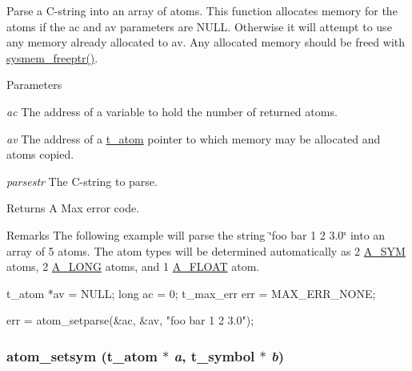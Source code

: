 Parse a C-\/string into an array of atoms. This function allocates memory for the atoms if the ac and av parameters are NULL. Otherwise it will attempt to use any memory already allocated to av. Any allocated memory should be freed with \hyperlink{group__memory_ga200c82639e547869db1f3887d17102d3}{sysmem\_\-freeptr()}.


\begin{DoxyParams}{Parameters}
\item[{\em ac}]The address of a variable to hold the number of returned atoms. \item[{\em av}]The address of a \hyperlink{structt__atom}{t\_\-atom} pointer to which memory may be allocated and atoms copied. \item[{\em parsestr}]The C-\/string to parse. \end{DoxyParams}
\begin{DoxyReturn}{Returns}
A Max error code.
\end{DoxyReturn}
\begin{DoxyRemark}{Remarks}
The following example will parse the string \char`\"{}foo bar 1 2 3.0\char`\"{} into an array of 5 atoms. The atom types will be determined automatically as 2 \hyperlink{group__atom_gga8aa6700e9f00b132eb376db6e39ade47a2d661c2a5d949566e2f1944c99bceeea}{A\_\-SYM} atoms, 2 \hyperlink{group__atom_gga8aa6700e9f00b132eb376db6e39ade47a002f28879581a6f66ea492b994b96f1e}{A\_\-LONG} atoms, and 1 \hyperlink{group__atom_gga8aa6700e9f00b132eb376db6e39ade47a0b3aa0ab8104573dfc9cb70b5b08031f}{A\_\-FLOAT} atom. 
\begin{DoxyCode}
    t_atom *av =  NULL;
    long ac = 0;
    t_max_err err = MAX_ERR_NONE;
    
    err = atom_setparse(&ac, &av, "foo bar 1 2 3.0");
\end{DoxyCode}
 
\end{DoxyRemark}
\hypertarget{group__atom_ga36c2619378802011ff0ff44bf74a807c}{
\subsubsection[{atom\_\-setsym}]{ atom\_\-setsym ({\bf t\_\-atom} $\ast$ {\em a}, \/  {\bf t\_\-symbol} $\ast$ {\em b})}}
\label{group__atom_ga36c2619378802011ff0ff44bf74a807c}


